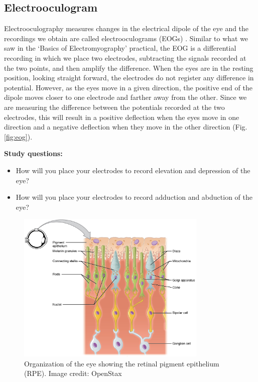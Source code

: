 \documentclass[12pt]{article}
\begin{document}
\subsection*{Electrooculogram}

Electrooculography measures changes in the electrical dipole of the eye and the recordings we obtain are called electrooculograms (EOGs) \cite{heide1999electrooculography,marg1951development,malmivuo1995bioelectromagnetism}. Similar to what we saw in the `Basics of Electromyography' practical, the EOG is a differential recording in which we place two electrodes, subtracting the signals recorded at the two points, and then amplify the difference. 
When the eyes are in the resting position, looking straight forward, the electrodes do not register any difference in potential. However, as the eyes move in a given direction, the positive end of the dipole moves closer to one electrode and farther away from the other. Since we are measuring the difference between the potentials recorded at the two electrodes, this will result in a positive deflection when the eyes move in one direction and a negative deflection when they move in the other direction \cite{malmivuo1995bioelectromagnetism} (Fig. \ref{fig:eog}).

\vspace{0.5cm}

\textbf{Study questions:}

\begin{itemize}
\item How will you place your electrodes to record elevation and depression of the eye?
\item How will you place your electrodes to record adduction and abduction of the eye?
\end{itemize} 

\begin{figure}[t!]
\centering
\includegraphics[width=0.81\textwidth]{images/rpe.png}
\caption{Organization of the eye showing the  retinal pigment epithelium (RPE). Image credit: OpenStax \cite{openStax2017sensory} }
\label{fig:rpe}
\end{figure}
\end{document}

